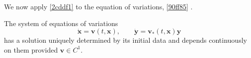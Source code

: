 We now apply \cref{2cddf1} to the equation of variations, \cref{90ff85} .

The system of equations of variations
\[
\dot{\boldsymbol{x}}=\boldsymbol{v}(t,\boldsymbol{x}),\qquad \dot{\boldsymbol{y}}=\boldsymbol{v}_{*}(t,\boldsymbol{x})\boldsymbol{y}
\]
has a solution uniquely determined by its initial data and depends continuously on them provided $\boldsymbol{v}\in C^{1}$.
